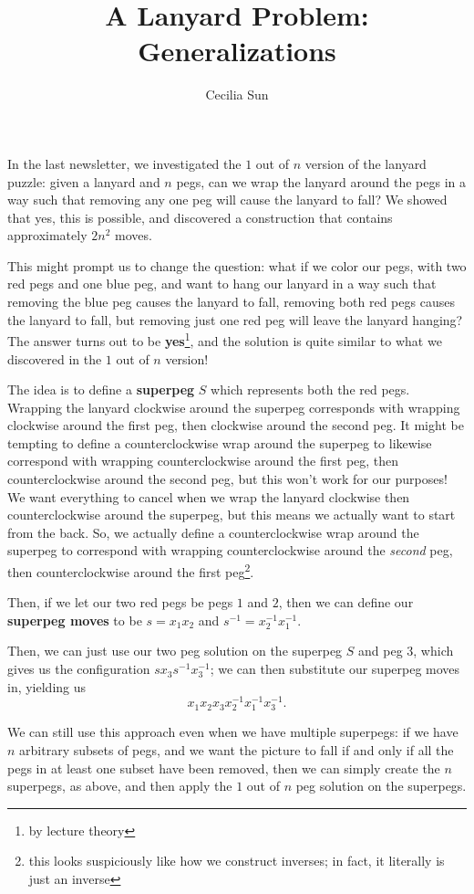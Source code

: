 \documentclass{article}
\title{A Lanyard Problem: Generalizations}
\author{Cecilia Sun}
\begin{document}
\maketitle
In the last newsletter, we investigated the $1$ out of $n$ version of the lanyard puzzle: given a lanyard and $n$ pegs, can we wrap the lanyard around the pegs in a way such that removing any one peg will cause the lanyard to fall? We showed that yes, this is possible, and discovered a construction that contains approximately $2n^2$ moves. 

This might prompt us to change the question: what if we color our pegs, with two red pegs and one blue peg, and want to hang our lanyard in a way such that removing the blue peg causes the lanyard to fall, removing both red pegs causes the lanyard to fall, but removing just one red peg will leave the lanyard hanging? The answer turns out to be \textbf{yes}\footnote{by lecture theory}, and the solution is quite similar to what we discovered in the $1$ out of $n$ version! 

The idea is to define a \textbf{superpeg} $S$ which represents both the red pegs. Wrapping the lanyard clockwise around the superpeg corresponds with wrapping clockwise around the first peg, then clockwise around the second peg. It might be tempting to define a counterclockwise wrap around the superpeg to likewise correspond with wrapping counterclockwise around the first peg, then counterclockwise around the second peg, but this won’t work for our purposes! We want everything to cancel when we wrap the lanyard clockwise then counterclockwise around the superpeg, but this means we actually want to start from the back. So, we actually define a counterclockwise wrap around the superpeg to correspond with wrapping counterclockwise around the \textit{second} peg, then counterclockwise around the first peg\footnote{this looks suspiciously like how we construct inverses; in fact, it literally is just an inverse}. 

Then, if we let our two red pegs be pegs $1$ and $2$, then we can define our \textbf{superpeg moves} to be $s=x_1x_2$ and $s^{-1}=x_2^{-1}x_1^{-1}$. 

Then, we can just use our two peg solution on the superpeg $S$ and peg $3$, which gives us the configuration $sx_3s^{-1}x_3^{-1}$; we can then substitute our superpeg moves in, yielding us 
\[x_1x_2x_3x_2^{-1}x_1^{-1}x_3^{-1}.\]

We can still use this approach even when we have multiple superpegs: if we have $n$ arbitrary subsets of pegs, and we want the picture to fall if and only if all the pegs in at least one subset have been removed, then we can simply create the $n$ superpegs, as above, and then apply the $1$ out of $n$ peg solution on the superpegs. 
\end{document}

